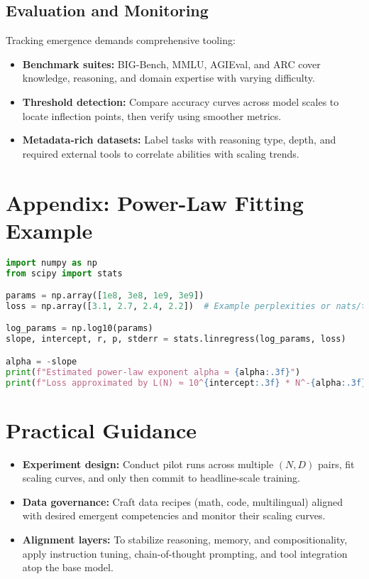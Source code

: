\documentclass{article}
\begin{document}
\subsection{Evaluation and Monitoring}
Tracking emergence demands comprehensive tooling:
\begin{itemize}
  \item \textbf{Benchmark suites:} BIG-Bench, MMLU, AGIEval, and ARC cover knowledge, reasoning, and domain expertise with varying difficulty.
  \item \textbf{Threshold detection:} Compare accuracy curves across model scales to locate inflection points, then verify using smoother metrics.
  \item \textbf{Metadata-rich datasets:} Label tasks with reasoning type, depth, and required external tools to correlate abilities with scaling trends.
\end{itemize}

\section{Appendix: Power-Law Fitting Example}
\begin{lstlisting}[language=Python,caption={Fitting a power-law exponent from experimental measurements},label={lst:powerlaw_en}]
import numpy as np
from scipy import stats

params = np.array([1e8, 3e8, 1e9, 3e9])
loss = np.array([3.1, 2.7, 2.4, 2.2])  # Example perplexities or nats/token

log_params = np.log10(params)
slope, intercept, r, p, stderr = stats.linregress(log_params, loss)

alpha = -slope
print(f"Estimated power-law exponent alpha ≈ {alpha:.3f}")
print(f"Loss approximated by L(N) ≈ 10^{intercept:.3f} * N^-{alpha:.3f}")
\end{lstlisting}

\section{Practical Guidance}
\begin{itemize}
  \item \textbf{Experiment design:} Conduct pilot runs across multiple $(N, D)$ pairs, fit scaling curves, and only then commit to headline-scale training.
  \item \textbf{Data governance:} Craft data recipes (math, code, multilingual) aligned with desired emergent competencies and monitor their scaling curves.
  \item \textbf{Alignment layers:} To stabilize reasoning, memory, and compositionality, apply instruction tuning, chain-of-thought prompting, and tool integration atop the base model.
\end{itemize}
\end{document}
